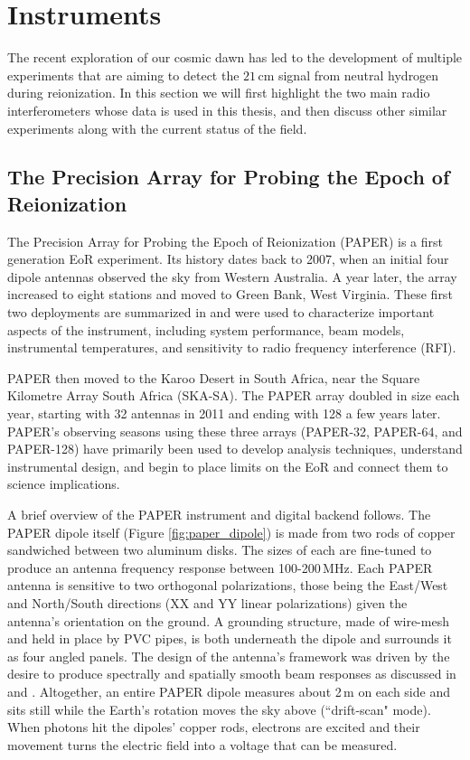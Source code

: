 \section{Instruments}

The recent exploration of our cosmic dawn has led to the development of multiple experiments that are aiming to detect the $21$\,cm signal from neutral hydrogen during reionization. In this section we will first highlight the two main radio interferometers whose data is used in this thesis, and then discuss other similar experiments along with the current status of the field.

\subsection{The Precision Array for Probing the Epoch of Reionization}
\label{sec:PAPER_intro}

The Precision Array for Probing the Epoch of Reionization (PAPER) is a first generation EoR experiment. Its history dates back to 2007, when an initial four dipole antennas observed the sky from Western Australia. A year later, the array increased to eight stations and moved to Green Bank, West Virginia. These first two deployments are summarized in \citet{parsons_et_al2010} and were used to characterize important aspects of the instrument, including system performance, beam models, instrumental temperatures, and sensitivity to radio frequency interference (RFI). 

PAPER then moved to the Karoo Desert in South Africa, near the Square Kilometre Array South Africa (SKA-SA). The PAPER array doubled in size each year, starting with 32 antennas in 2011 and ending with 128 a few years later. PAPER's observing seasons using these three arrays (PAPER-32, PAPER-64, and PAPER-128) have primarily been used to develop analysis techniques, understand instrumental design, and begin to place limits on the EoR and connect them to science implications.

A brief overview of the PAPER instrument and digital backend follows. The PAPER dipole itself (Figure \ref{fig:paper_dipole}) is made from two rods of copper sandwiched between two aluminum disks. The sizes of each are fine-tuned to produce an antenna frequency response between 100-200\,MHz. Each PAPER antenna is sensitive to two orthogonal polarizations, those being the East/West and North/South directions (XX and YY linear polarizations) given the antenna's orientation on the ground. A grounding structure, made of wire-mesh and held in place by PVC pipes, is both underneath the dipole and surrounds it as four angled panels. The design of the antenna's framework was driven by the desire to produce spectrally and spatially smooth beam responses as discussed in \citet{parsons_et_al2010} and \citet{pober_et_al2012}. Altogether, an entire PAPER dipole measures about 2\,m on each side and sits still while the Earth's rotation moves the sky above (``drift-scan" mode). When photons hit the dipoles' copper rods, electrons are excited and their movement turns the electric field into a voltage that can be measured.

